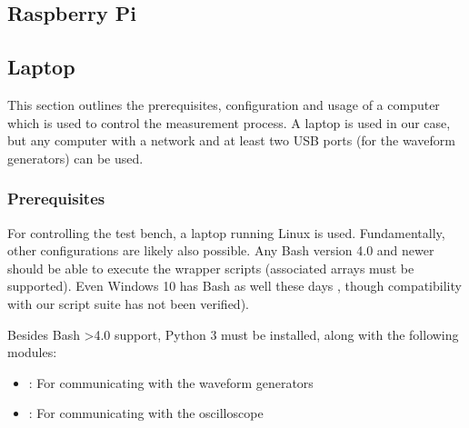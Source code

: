 \subsection{Raspberry Pi}
\label{subsec:raspi}



\subsection{Laptop}
\label{subsec:laptop}

This section outlines the prerequisites, configuration and usage of a computer
which is  used to  control the  measurement process. A laptop  is used  in our
case, but  any computer with  a network  and at least  two USB ports  (for the
waveform generators) can be used.


\subsubsection{Prerequisites}
\label{subsubsec:laptop:prereqs}

For controlling the test bench, a laptop running Linux is used. Fundamentally,
other configurations are likely also  possible. Any Bash version 4.0 and newer
should  be able  to execute  the wrapper  scripts (associated  arrays must  be
supported). Even Windows 10  has Bash as well  these days \cite{ref:W10:bash},
though compatibility with our script suite has not been verified).

Besides  Bash  >4.0 support,  Python  3  must  be  installed, along  with  the
following modules:

\begin{itemize}\tightlist
    \item
        : For communicating with the waveform generators
    \item
        : For communicating with the oscilloscope
\end{itemize}

